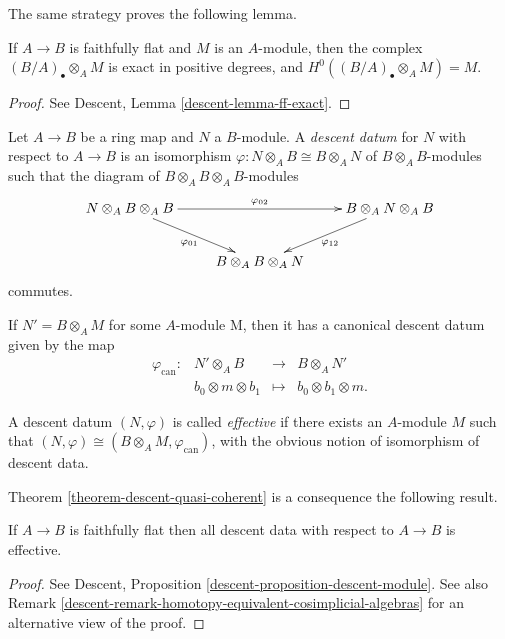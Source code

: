 \medskip\noindent
The same strategy proves the following lemma.

\begin{lemma}
\label{lemma-descent-modules}
If $A \to B$ is faithfully flat and $M$ is an $A$-module, then the
complex $(B/A)_\bullet \otimes_A M$ is exact in positive degrees, and
$H^0((B/A)_\bullet \otimes_A M) = M$.
\end{lemma}

\begin{proof}
See Descent, Lemma \ref{descent-lemma-ff-exact}.
\end{proof}

\begin{definition}
\label{definition-descent-datum-modules}
Let $A \to B$ be a ring map and $N$ a $B$-module. A {\it descent datum} for
$N$ with respect to $A \to B$ is an isomorphism $\varphi: N\otimes_A B \cong
B\otimes_A N$ of $B\otimes_A B$-modules such that the diagram of $B\otimes_A B
\otimes_A B$-modules
$$
\xymatrix{
{N \otimes_A B \otimes_A B} \ar_{\varphi_{01}}[dr] \ar^{\varphi_{02}}[rr] & &
{B \otimes_A N \otimes_A B}\ar^{\varphi_{12}}[dl] \\
& {B \otimes_A B \otimes_A N}
}
$$
commutes.
\end{definition}

\noindent
If $N' = B \otimes_A M$ for some $A$-module M, then it has a canonical descent
datum given by the map
$$
\begin{matrix}
\varphi_\text{can}: & N' \otimes_A B & \to & B \otimes_A N' \\
& b_0 \otimes m \otimes b_1 & \mapsto & b_0 \otimes b_1 \otimes m.
\end{matrix}
$$

\begin{definition}
\label{definition-effective-modules}
A descent datum $(N,\varphi)$ is called {\it effective} if there exists an
$A$-module $M$ such that $(N,\varphi) \cong (B\otimes_A M,
\varphi_\text{can})$, with the obvious notion of isomorphism of descent data.
\end{definition}

\noindent
Theorem \ref{theorem-descent-quasi-coherent} is a consequence the
following result.

\begin{theorem}
\label{theorem-descent-modules}
If $A \to B$ is faithfully flat then all descent data with respect to $A\to B$
is effective.
\end{theorem}

\begin{proof}
See
Descent, Proposition \ref{descent-proposition-descent-module}.
See also
Remark \ref{descent-remark-homotopy-equivalent-cosimplicial-algebras}
for an alternative view of the proof.
\end{proof}

